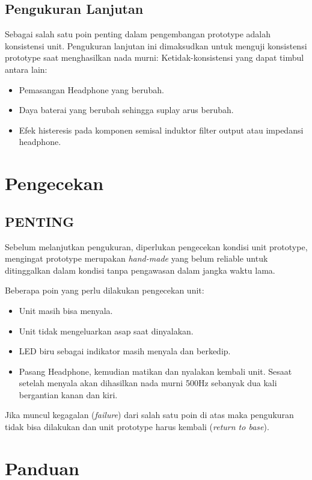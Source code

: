 \documentclass[12pt,]{article}
\begin{document}
	\newpage
	\subsection{Pengukuran Lanjutan}
	Sebagai salah satu poin penting dalam pengembangan prototype adalah konsistensi unit.
	Pengukuran lanjutan ini dimaksudkan untuk menguji konsistensi prototype saat menghasilkan nada murni:
	Ketidak-konsistensi yang dapat timbul antara lain:
	\begin{itemize}
		\item Pemasangan Headphone yang berubah.
		\item Daya baterai yang berubah sehingga suplay arus berubah.
		\item Efek histeresis pada komponen semisal induktor filter output atau impedansi headphone.
	\end{itemize}

	\newpage
	\section{Pengecekan}
	
	\subsection{PENTING}
	
	Sebelum melanjutkan pengukuran, diperlukan pengecekan kondisi unit prototype,
	mengingat prototype merupakan \textit{hand-made} yang belum reliable untuk ditinggalkan dalam
	kondisi tanpa pengawasan dalam jangka waktu lama.
	
	Beberapa poin yang perlu dilakukan pengecekan unit:
	\begin{itemize}
		\item Unit masih bisa menyala.
		\item Unit tidak mengeluarkan asap saat dinyalakan.
		\item LED biru sebagai indikator masih menyala dan berkedip.
		\item Pasang Headphone, kemudian matikan dan nyalakan kembali unit. Sesaat setelah menyala
		akan dihasilkan nada murni 500Hz sebanyak dua kali bergantian kanan dan kiri.
	\end{itemize}
	
	Jika muncul kegagalan (\textit{failure}) dari salah satu poin di atas maka pengukuran tidak bisa dilakukan
	dan unit prototype harus kembali (\textit{return to base}).
	
	\newpage
	\section{Panduan}
	
\end{document}
